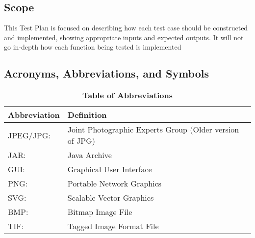 \documentclass[12pt, titlepage]{article}
\begin{document}
\subsection{Scope}

This Test Plan is focused on describing how each test case should be constructed and implemented, showing appropriate inputs and expected outputs. It will not go in-depth how each function being tested is implemented

\subsection{Acronyms, Abbreviations, and Symbols}
	
\begin{table}[hbp]
\caption{\textbf{Table of Abbreviations}} \label{Table}

\begin{tabularx}{\textwidth}{p{3cm}X}
\toprule
\textbf{Abbreviation} & \textbf{Definition} \\
\midrule
JPEG/JPG: & Joint Photographic Experts Group (Older version of JPG)\\
JAR: & Java Archive \\
GUI: & Graphical User Interface\\
PNG:  & Portable Network Graphics\\
SVG: & Scalable Vector Graphics\\
BMP: & Bitmap Image File\\
TIF: & Tagged Image Format File \\
\bottomrule
\end{tabularx}

\end{table}
\end{document}
